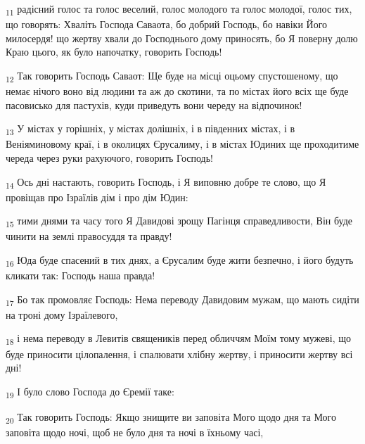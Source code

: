 \begin{tcolorbox}
\textsubscript{11} радісний голос та голос веселий, голос молодого та голос молодої, голос тих, що говорять: Хваліть Господа Саваота, бо добрий Господь, бо навіки Його милосердя! що жертву хвали до Господнього дому приносять, бо Я поверну долю Краю цього, як було напочатку, говорить Господь!
\end{tcolorbox}
\begin{tcolorbox}
\textsubscript{12} Так говорить Господь Саваот: Ще буде на місці оцьому спустошеному, що немає нічого воно від людини та аж до скотини, та по містах його всіх ще буде пасовисько для пастухів, куди приведуть вони череду на відпочинок!
\end{tcolorbox}
\begin{tcolorbox}
\textsubscript{13} У містах у горішніх, у містах долішніх, і в південних містах, і в Веніяминовому краї, і в околицях Єрусалиму, і в містах Юдиних ще проходитиме череда через руки рахуючого, говорить Господь!
\end{tcolorbox}
\begin{tcolorbox}
\textsubscript{14} Ось дні настають, говорить Господь, і Я виповню добре те слово, що Я провіщав про Ізраїлів дім і про дім Юдин:
\end{tcolorbox}
\begin{tcolorbox}
\textsubscript{15} тими днями та часу того Я Давидові зрощу Пагінця справедливости, Він буде чинити на землі правосуддя та правду!
\end{tcolorbox}
\begin{tcolorbox}
\textsubscript{16} Юда буде спасений в тих днях, а Єрусалим буде жити безпечно, і його будуть кликати так: Господь наша правда!
\end{tcolorbox}
\begin{tcolorbox}
\textsubscript{17} Бо так промовляє Господь: Нема переводу Давидовим мужам, що мають сидіти на троні дому Ізраїлевого,
\end{tcolorbox}
\begin{tcolorbox}
\textsubscript{18} і нема переводу в Левитів священиків перед обличчям Моїм тому мужеві, що буде приносити цілопалення, і спалювати хлібну жертву, і приносити жертву всі дні!
\end{tcolorbox}
\begin{tcolorbox}
\textsubscript{19} І було слово Господа до Єремії таке:
\end{tcolorbox}
\begin{tcolorbox}
\textsubscript{20} Так говорить Господь: Якщо знищите ви заповіта Мого щодо дня та Мого заповіта щодо ночі, щоб не було дня та ночі в їхньому часі,
\end{tcolorbox}
